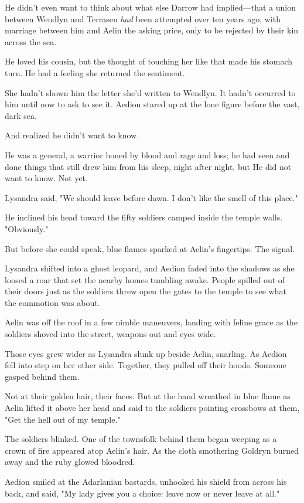 He didn't even want to think about what else Darrow had implied---that a union between Wendlyn and Terrasen \emph{had} been attempted over ten years ago, with marriage between him and Aelin the asking price, only to be rejected by their kin across the sea.

He loved his cousin, but the thought of touching her like that made his stomach turn. He had a feeling she returned the sentiment.

She hadn't shown him the letter she'd written to Wendlyn. It hadn't occurred to him until now to ask to see it. Aedion stared up at the lone figure before the vast, dark sea.

And realized he didn't want to know.

He was a general, a warrior honed by blood and rage and loss; he had seen and done things that still drew him from his sleep, night after night, but  He did not want to know. Not yet.

Lysandra said, "We should leave before dawn. I don't like the smell of this place."

He inclined his head toward the fifty soldiers camped inside the temple walls. "Obviously."

But before she could speak, blue flames sparked at Aelin's fingertips. The signal.

Lysandra shifted into a ghost leopard, and Aedion faded into the shadows as she loosed a roar that set the nearby homes tumbling awake. People spilled out of their doors just as the soldiers threw open the gates to the temple to see what the commotion was about.

Aelin was off the roof in a few nimble maneuvers, landing with feline grace as the soldiers shoved into the street, weapons out and eyes wide.

Those eyes grew wider as Lysandra slunk up beside Aelin, snarling. As Aedion fell into step on her other side. Together, they pulled off their hoods. Someone gasped behind them.

Not at their golden hair, their faces. But at the hand wreathed in blue flame as Aelin lifted it above her head and said to the soldiers pointing crossbows at them, "Get the hell out of my temple."

The soldiers blinked. One of the townsfolk behind them began weeping as a crown of fire appeared atop Aelin's hair. As the cloth smothering Goldryn burned away and the ruby glowed bloodred.

Aedion smiled at the Adarlanian bastards, unhooked his shield from across his back, and said, "My lady gives you a choice: leave now
 or never leave at all."

